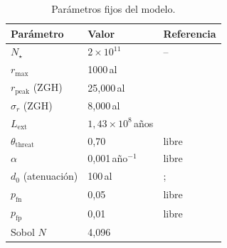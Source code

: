\documentclass[11pt,a4paper,onecolumn]{article}
\begin{document}
\begin{table}
  \centering
  \caption{Parámetros fijos del modelo.}
  \label{tab:params}
  \begin{tabular}{lll}
    \toprule
    Parámetro & Valor & Referencia \\
    \midrule
    $N_\star$ & $2\times10^{11}$ & -- \\
    $r_\text{max}$ & 1000\,al & \citet{troitskij1989,loeb2007} \\
    $r_\text{peak}$ (ZGH) & 25{,}000\,al & \citet{lineweaver2004} \\
    $\sigma_r$ (ZGH) & 8{,}000\,al & \citet{lineweaver2004} \\
    $L_\text{ext}$ & $1{,}43\times10^8$\,años & \citet{sandberg2018} \\
    $\theta_\text{threat}$ & 0{,}70 & libre \\
    $\alpha$ & 0{,}001\,año$^{-1}$ & libre \\
    $d_0$ (atenuación) & 100\,al & \citet{loeb2007}; \citet{forgannichol2011} \\
    $p_\text{fn}$ & 0{,}05 & libre \\
    $p_\text{fp}$ & 0{,}01 & libre \\
    Sobol $N$ & 4{,}096 & \citet{saltelli2010} \\
    \bottomrule
  \end{tabular}
\end{table}
\end{document}

